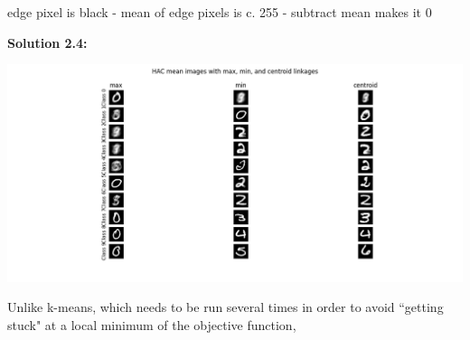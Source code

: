 \documentclass[submit]{harvardml}
\begin{document}
edge pixel is black - mean of edge pixels is c. 255 - subtract mean makes it 0

\noindent\textbf{Solution 2.4:}\\
\begin{center}
    \includegraphics[scale=0.6]{2.4.png}
\end{center}
Unlike k-means, which needs to be run several times in order to avoid ``getting stuck" at a local minimum of the objective function,  
\end{document}
